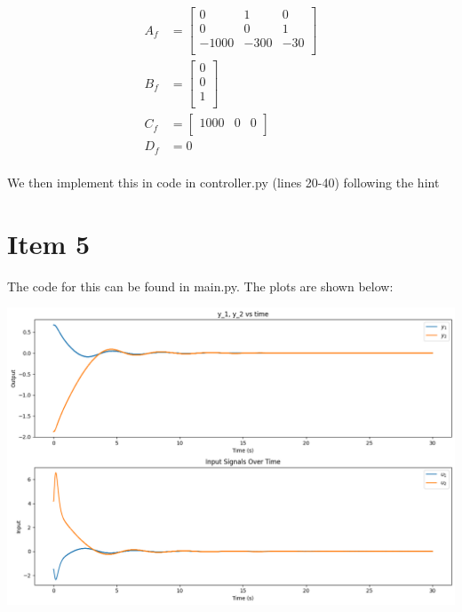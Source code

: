 \documentclass[conference]{IEEEtran}
\begin{document}
\begin{align*}
    A_f &= \begin{bmatrix}
        0 & 1 & 0 \\
        0 & 0 & 1 \\
        -1000 & -300 & -30 \\
    \end{bmatrix} \\
    B_f &= \begin{bmatrix}
        0 \\
        0 \\
        1 \\
    \end{bmatrix} \\
    C_f &= \begin{bmatrix}
        1000 & 0 & 0 \\
    \end{bmatrix} \\
    D_f &= 0 \\
\end{align*}

We then implement this in code in controller.py (lines 20-40) following the hint

\section{Item 5}

The code for this can be found in main.py. The plots are shown below:

\includegraphics[width=500pt]{p3.png}
\end{document}
